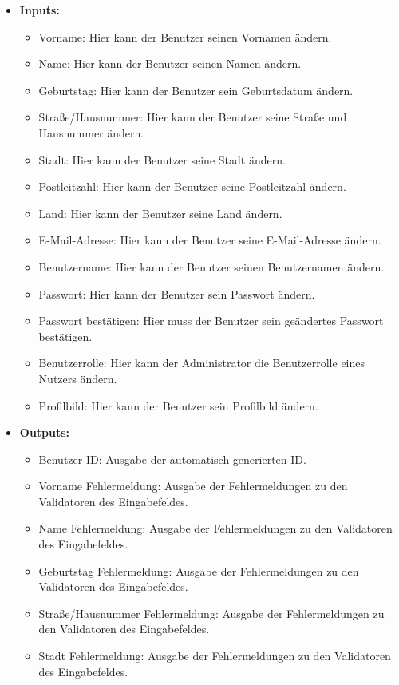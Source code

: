 \begin{itemize}
						\item \textbf{Inputs:}
							\begin{itemize}
								\item Vorname: Hier kann der Benutzer seinen Vornamen ändern.
								\item Name: Hier kann der Benutzer seinen Namen ändern.
								\item Geburtstag: Hier kann der Benutzer sein Geburtsdatum ändern.
								\item Straße/Hausnummer: Hier kann der Benutzer seine Straße und Hausnummer ändern.
								\item Stadt: Hier kann der Benutzer seine Stadt ändern.
								\item Postleitzahl: Hier kann der Benutzer seine Postleitzahl ändern.
								\item Land: Hier kann der Benutzer seine Land ändern.
								\item E-Mail-Adresse: Hier kann der Benutzer seine E-Mail-Adresse ändern.
								\item Benutzername: Hier kann der Benutzer seinen Benutzernamen ändern.
								\item Passwort: Hier kann der Benutzer sein Passwort ändern.
								\item Passwort bestätigen: Hier muss der Benutzer sein geändertes Passwort bestätigen.
								\item Benutzerrolle: Hier kann der Administrator die Benutzerrolle eines Nutzers ändern.
								\item Profilbild: Hier kann der Benutzer sein Profilbild ändern.
							\end{itemize}
						\item \textbf{Outputs:}
							\begin{itemize}
								\item Benutzer-ID: Ausgabe der automatisch generierten ID.
								\item Vorname Fehlermeldung: Ausgabe der Fehlermeldungen zu den Validatoren des Eingabefeldes.
								\item Name Fehlermeldung: Ausgabe der Fehlermeldungen zu den Validatoren des Eingabefeldes.
								\item Geburtstag Fehlermeldung: Ausgabe der Fehlermeldungen zu den Validatoren des Eingabefeldes.
								\item Straße/Hausnummer Fehlermeldung: Ausgabe der Fehlermeldungen zu den Validatoren des Eingabefeldes.
								\item Stadt Fehlermeldung: Ausgabe der Fehlermeldungen zu den Validatoren des Eingabefeldes.

\end{itemize}
\end{itemize}

